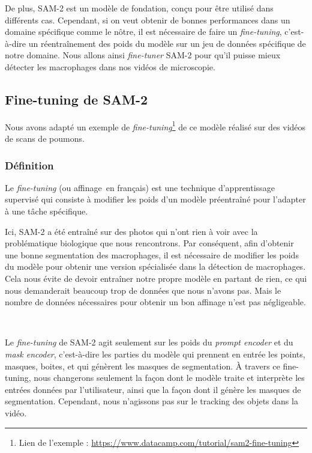 \documentclass[a4paper,12pt]{report}
\begin{document}
De plus, SAM-2 est un modèle de fondation, conçu pour être utilisé dans différents cas. Cependant, si on veut obtenir de bonnes performances dans un domaine spécifique comme le nôtre, il est nécessaire de faire un \textit{fine-tuning}, c'est-à-dire un réentraînement des poids du modèle sur un jeu de données spécifique de notre domaine. Nous allons ainsi \textit{fine-tuner} SAM-2 pour qu'il puisse mieux détecter les macrophages dans nos vidéos de microscopie.

\subsection{Fine-tuning de SAM-2}
%
Nous avons adapté un exemple de \textit{fine-tuning}\footnote{Lien de l'exemple : \url{https://www.datacamp.com/tutorial/sam2-fine-tuning}} de ce modèle réalisé sur des vidéos de scans de poumons.
\subsubsection{Définition}
Le \textit{fine-tuning} (ou \og affinage\fg\ en français) est une technique d'apprentissage supervisé qui consiste à modifier les poids d'un modèle préentraîné pour l'adapter à une tâche spécifique.

Ici, SAM-2 a été entraîné sur des photos qui n'ont rien à voir avec la problématique biologique que nous rencontrons. Par conséquent, afin d'obtenir une bonne segmentation des macrophages, il est nécessaire de modifier les poids du modèle pour obtenir une version spécialisée dans la détection de macrophages. Cela nous évite de devoir entraîner notre propre modèle en partant de rien, ce qui nous demanderait beaucoup trop de données que nous n'avons pas. Mais le nombre de données nécessaires pour obtenir un bon affinage n'est pas négligeable.

\

Le \textit{fine-tuning} de SAM-2 agit seulement sur les poids du \textit{prompt encoder} et du \textit{mask encoder}, c'est-à-dire les parties du modèle qui prennent en entrée les points, masques, boites, et qui génèrent les masques de segmentation. À travers ce fine-tuning, nous changerons seulement la façon dont le modèle traite et interprète les entrées données par l'utilisateur, ainsi que la façon dont il génère les masques de segmentation. Cependant, nous n'agissons pas sur le tracking des objets dans la vidéo.
\end{document}
